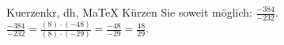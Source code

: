 \begin{MAufgabe}{Kuerzen}{kr, dh, MaTeX}
K\"urzen Sie soweit m\"oglich: $\frac{-384}{-232}$.\\ 
\ifLsg\MLoesung
\quad $\frac{-384}{-232}=\frac{(8)\cdot(-48)}{(8)\cdot(-29)}=\frac{-48}{-29}=\frac{48}{29}$.\else\relax\fi
 \end{MAufgabe}